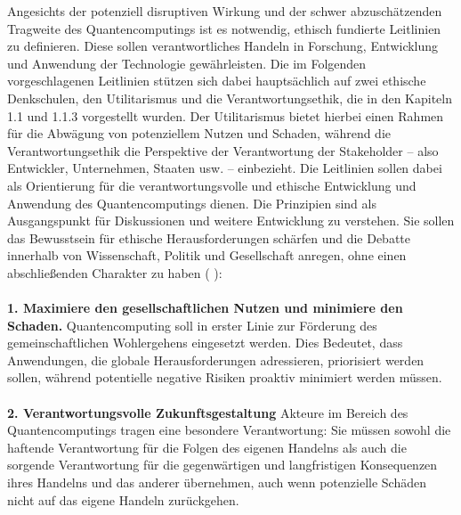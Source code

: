 Angesichts der potenziell disruptiven Wirkung und der schwer abzuschätzenden Tragweite des Quantencomputings ist es notwendig, ethisch fundierte Leitlinien zu definieren. Diese sollen verantwortliches Handeln in Forschung, Entwicklung und Anwendung der Technologie gewährleisten. Die im Folgenden vorgeschlagenen Leitlinien stützen sich dabei hauptsächlich auf zwei ethische Denkschulen, den Utilitarismus und die Verantwortungsethik, die in den Kapiteln 1.1 und 1.1.3 vorgestellt wurden. Der Utilitarismus bietet hierbei einen Rahmen für die Abwägung von potenziellem Nutzen und Schaden, während die Verantwortungsethik die Perspektive der Verantwortung der Stakeholder – also Entwickler, Unternehmen, Staaten usw. – einbezieht. Die Leitlinien sollen dabei als Orientierung für die verantwortungsvolle und ethische Entwicklung und Anwendung des Quantencomputings dienen. Die Prinzipien sind als Ausgangspunkt für Diskussionen und weitere Entwicklung zu verstehen. Sie sollen das Bewusstsein für ethische Herausforderungen schärfen und die Debatte innerhalb von Wissenschaft, Politik und Gesellschaft anregen, ohne einen abschließenden Charakter zu haben (\cite{kop_quantum-elspi_2023} \cite{kop_establishing_nodate}  \cite{european_commission_directorate_general_for_communications_networks_content_and_technology_ethik-leitlinien_2019}):
\\
\\
\textbf{1. Maximiere den gesellschaftlichen Nutzen und minimiere den Schaden.}
Quantencomputing soll in erster Linie zur Förderung des gemeinschaftlichen Wohlergehens eingesetzt werden. Dies Bedeutet, dass Anwendungen, die globale Herausforderungen adressieren, priorisiert werden sollen, während potentielle negative Risiken proaktiv minimiert werden müssen. 
\\
\\
\textbf{2. Verantwortungsvolle Zukunftsgestaltung }
Akteure im Bereich des Quantencomputings tragen eine besondere Verantwortung: Sie müssen sowohl die haftende Verantwortung für die Folgen des eigenen Handelns als auch die sorgende Verantwortung für die gegenwärtigen und langfristigen Konsequenzen ihres Handelns und das anderer übernehmen, auch wenn potenzielle Schäden nicht auf das eigene Handeln zurückgehen.
\\
\\
